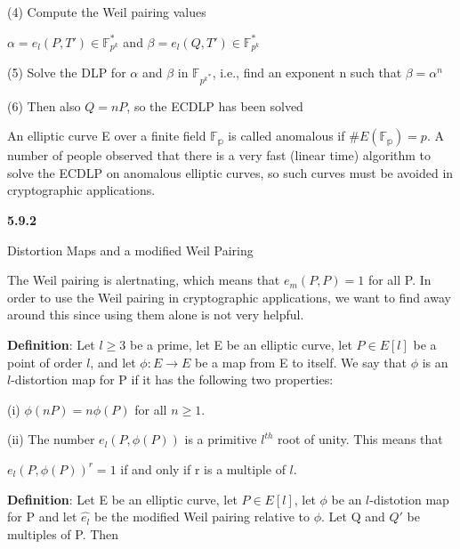\documentclass[titlepage]{article}
\begin{document}
\hspace{\parindent}(4) Compute the Weil pairing values

\begin{center} 
$\alpha = e_l(P,T') \in \mathbb{F}_{p^k}^*$ and $\beta = e_l(Q,T') \in \mathbb{F}_{p^k}^*$
\end{center} 

\hspace{\parindent}(5) Solve the DLP for $\alpha$ and $\beta$ in $\mathbb{F}_{{p^k}^*}$, i.e., find an exponent n such that $\beta = \alpha^n$

\hspace{\parindent}(6) Then also $Q=nP$, so the ECDLP has been solved

An elliptic curve E over a finite field $\mathbb{F_p}$ is called anomalous if $\#E(\mathbb{F_p}) = p$. A number of people observed that there is a very fast (linear time) algorithm to solve the ECDLP on anomalous elliptic curves, so such curves must be avoided in cryptographic applications.

\textbf{5.9.2}

Distortion Maps and a modified Weil Pairing

The Weil pairing is alertnating, which means that $e_m(P,P) = 1$ for all P. In order to use the Weil pairing in cryptographic applications, we want to find away around this since using them alone is not very helpful. 

\textbf{Definition}: Let $l \geq 3$ be a prime, let E be an elliptic curve, let $P \in E[l]$ be a point of order $l$, and let $\phi : E \longrightarrow E$ be a map from E to itself. We say that $\phi$ is an $l$-distortion map for P if it has the following two properties:

\hspace{\parindent} (i) $\phi(nP) = n\phi(P)$ for all $n \geq 1$.

\hspace{\parindent} (ii) The number $e_l(P,\phi(P))$ is a primitive $l^{th}$ root of unity. This means that

\begin{center}
$e_l(P,\phi(P))^r = 1$ if and only if r is a multiple of $l$.

\end{center} 

\textbf{Definition}: Let E be an elliptic curve, let $P\in E[l]$, let $\phi$ be an $l$-distotion map for P and let $\hat{e_l}$ be the modified Weil pairing relative to $\phi$. Let Q and $Q'$ be multiples of P. Then
\end{document}
